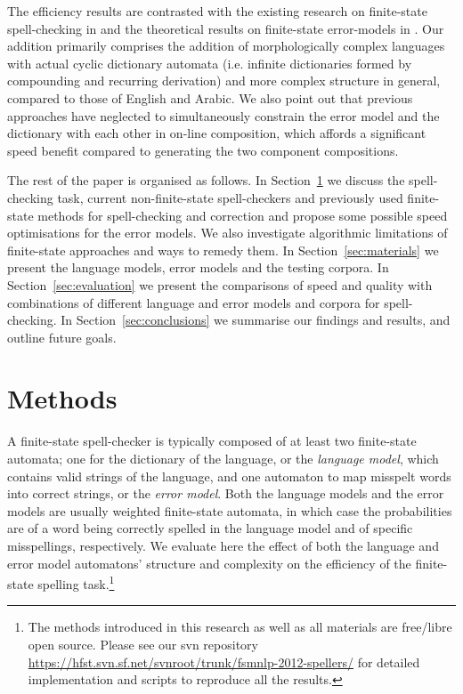 \documentclass[11pt]{article}
\begin{document}
The efficiency results are contrasted with the existing research on
finite-state spell-checking in  and the theoretical
results on finite-state error-models in .  Our addition
primarily comprises the addition of morphologically complex languages with
actual cyclic dictionary automata (i.e. infinite dictionaries formed by
compounding and recurring derivation) and more complex structure in general,
compared to those of English and Arabic. We also point out that previous
approaches have neglected to simultaneously constrain the error model and the
dictionary with each other in on-line composition, which affords a significant
speed benefit compared to generating the two component compositions.

The rest of the paper is organised as follows. In Section~\ref{sec:methods} we
discuss the spell-checking task, current non-finite-state spell-checkers and
previously used finite-state methods for spell-checking and correction and
propose some possible speed optimisations for the error models.
We also investigate algorithmic limitations of finite-state approaches and
ways to remedy them. In
Section~\ref{sec:materials} we present the language models, error models and the
testing corpora. In Section~\ref{sec:evaluation} we
present the comparisons of speed and quality with combinations of different
language and error models and corpora for spell-checking. In
Section~\ref{sec:conclusions} we summarise our findings and results,
and outline future goals.


\section{Methods}
\label{sec:methods}

A finite-state spell-checker is typically composed of at least two finite-state
automata; one for the dictionary of the language, or the \emph{language model},
which contains valid strings of the language, and one automaton to map misspelt
words into correct strings, or the \emph{error model}. Both the language models
and the error models are usually weighted finite-state automata, in which
case the probabilities are of a word being correctly spelled in the language
model and of specific misspellings, respectively.
We evaluate here the effect of both the language and error model automatons'
structure and complexity on the efficiency of the finite-state
spelling task.\footnote{The methods introduced in this research
as well as all materials are free/libre open source. Please see our svn
repository \url{https://hfst.svn.sf.net/svnroot/trunk/fsmnlp-2012-spellers/}
for detailed implementation and scripts to reproduce all the
results.}
\end{document}
